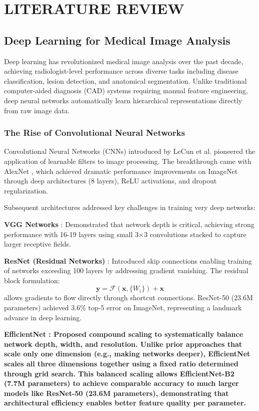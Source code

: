 \chapter{LITERATURE REVIEW}
\label{ch:literature}

\section{Deep Learning for Medical Image Analysis}

Deep learning has revolutionized medical image analysis over the past decade, achieving radiologist-level performance across diverse tasks including disease classification, lesion detection, and anatomical segmentation. Unlike traditional computer-aided diagnosis (CAD) systems requiring manual feature engineering, deep neural networks automatically learn hierarchical representations directly from raw image data.

\subsection{The Rise of Convolutional Neural Networks}

Convolutional Neural Networks (CNNs) introduced by LeCun et al. pioneered the application of learnable filters to image processing. The breakthrough came with AlexNet \cite{krizhevsky2012imagenet}, which achieved dramatic performance improvements on ImageNet through deep architectures (8 layers), ReLU activations, and dropout regularization.

Subsequent architectures addressed key challenges in training very deep networks:

\textbf{VGG Networks} \cite{simonyan2015very}: Demonstrated that network depth is critical, achieving strong performance with 16-19 layers using small 3×3 convolutions stacked to capture larger receptive fields.

\textbf{ResNet (Residual Networks)} \cite{he2016deep}: Introduced skip connections enabling training of networks exceeding 100 layers by addressing gradient vanishing. The residual block formulation:
\begin{equation}
\mathbf{y} = \mathcal{F}(\mathbf{x}, \{W_i\}) + \mathbf{x}
\end{equation}
allows gradients to flow directly through shortcut connections. ResNet-50 (23.6M parameters) achieved 3.6\% top-5 error on ImageNet, representing a landmark advance in deep learning.

\textbf{EfficientNet \cite{tan2019efficientnet}: Proposed compound scaling to systematically balance network depth, width, and resolution. Unlike prior approaches that scale only one dimension (e.g., making networks deeper), EfficientNet scales all three dimensions together using a fixed ratio determined through grid search. This balanced scaling allows EfficientNet-B2 (7.7M parameters) to achieve comparable accuracy to much larger models like ResNet-50 (23.6M parameters), demonstrating that architectural efficiency enables better feature quality per parameter.}

